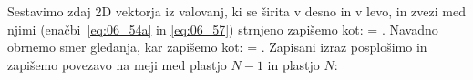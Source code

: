 Sestavimo zdaj 2D vektorja iz valovanj, ki se širita v desno in v levo, in zvezi
med njimi (enačbi~\ref{eq:06_54a} in \ref{eq:06_57}) strnjeno zapišemo kot:
\beq
\left[\begin{array}{c}
E_{2}\\
E_{2}'\\
\end{array}\right] =
\left[\begin{array}{cc}
1& r_{21}\\
r_{21}& 1\\
\end{array}\right]\cdot
{}\!\!.
\label{eq:06_58}
\eeq
Navadno obrnemo smer gledanja, kar zapišemo kot:
\beq
{} =
\left[\begin{array}{cc}
1& r_{12}\\
r_{12}& 1\\
\end{array}\right]\cdot
\left[\begin{array}{c}
E_2\\
E_2'\\
\end{array}\right]\!\!.
\label{eq:06_59}
\eeq
Zapisani izraz posplošimo in zapišemo povezavo na meji med plastjo 
$N-1$ in plastjo $N$:

